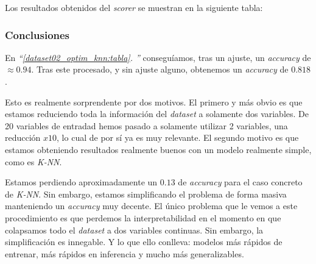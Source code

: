 \documentclass[11pt]{article}
\newcommand{\customcite}[1]{\emph{``\ref{#1}. \nameref{#1}''}}
\begin{document}
Los resultados obtenidos del \emph{scorer} se muestran en la siguiente tabla:

\begin{table}[H]
\begin{center}
\end{center}
    \caption{Resultados de entrenar \emph{K-NN}, con 10 vecinos, en el conjunto de datos tras el procesado}
\end{table}

\subsubsection{Conclusiones} \label{dataset02_procesado_conclusiones:seccion}

En \customcite{dataset02_optim_knn:tabla} conseguíamos, tras un ajuste, un \emph{accuracy} de $\approx 0.94$. Tras este procesado, y sin ajuste alguno, obtenemos un \emph{accuracy} de $0.818$.

Esto es realmente sorprendente por dos motivos. El primero y más obvio es que estamos reduciendo toda la información del \emph{dataset} a solamente dos variables. De 20 variables de entradad hemos pasado a solamente utilizar 2 variables, una reducción $x10$, lo cual de por sí ya es muy relevante. El segundo motivo es que estamos obteniendo resultados realmente buenos con un modelo realmente simple, como es \emph{K-NN}.

Estamos perdiendo aproximadamente un $0.13$ de \emph{accuracy} para el caso concreto de \emph{K-NN}. Sin embargo, estamos simplificando el problema de forma masiva manteniendo un \emph{accuracy} muy decente. El único problema que le vemos a este procedimiento es que perdemos la interpretabilidad en el momento en que colapsamos todo el \emph{dataset} a dos variables continuas. Sin embargo, la simplificación es innegable. Y lo que ello conlleva: modelos más rápidos de entrenar, más rápidos en inferencia y mucho más generalizables.
\end{document}
